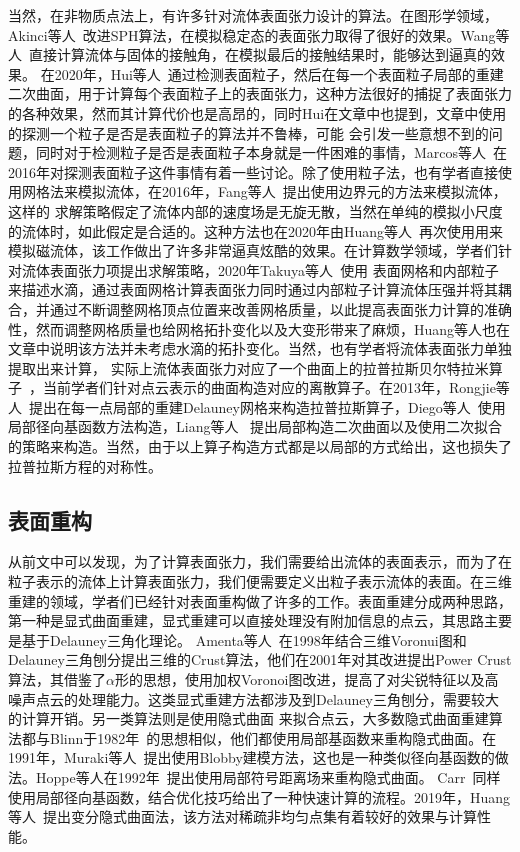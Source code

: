 当然，在非物质点法上，有许多针对流体表面张力设计的算法。在图形学领域，Akinci等人~\cite{akinci2013versatile}改进SPH算法，在模拟稳定态的表面张力取得了很好的效果。Wang等人~\cite{wang2005water}直接计算流体与固体的接触角，在模拟最后的接触结果时，能够达到逼真的效果。
在2020年，Hui等人~\cite{wang2020codimensional}通过检测表面粒子，然后在每一个表面粒子局部的重建二次曲面，用于计算每个表面粒子上的表面张力，这种方法很好的捕捉了表面张力的各种效果，然而其计算代价也是高昂的，同时Hui在文章中也提到，文章中使用的探测一个粒子是否是表面粒子的算法并不鲁棒，可能
会引发一些意想不到的问题，同时对于检测粒子是否是表面粒子本身就是一件困难的事情，Marcos等人~\cite{sandim2016boundary}在2016年对探测表面粒子这件事情有着一些讨论。除了使用粒子法，也有学者直接使用网格法来模拟流体，在2016年，Fang等人~\cite{da2016surface}提出使用边界元的方法来模拟流体，这样的
求解策略假定了流体内部的速度场是无旋无散，当然在单纯的模拟小尺度的流体时，如此假定是合适的。这种方法也在2020年由Huang等人~\cite{huang2020surface}再次使用用来模拟磁流体，该工作做出了许多非常逼真炫酷的效果。在计算数学领域，学者们针对流体表面张力项提出求解策略，2020年Takuya等人~\cite{matsunaga2020moving}使用
表面网格和内部粒子来描述水滴，通过表面网格计算表面张力同时通过内部粒子计算流体压强并将其耦合，并通过不断调整网格顶点位置来改善网格质量，以此提高表面张力计算的准确性，然而调整网格质量也给网格拓扑变化以及大变形带来了麻烦，Huang等人也在文章中说明该方法并未考虑水滴的拓扑变化。当然，也有学者将流体表面张力单独提取出来计算，
实际上流体表面张力对应了一个曲面上的拉普拉斯贝尔特拉米算子~\cite{needham2021visual}，当前学者们针对点云表示的曲面构造对应的离散算子。在2013年，Rongjie等人~\cite{lai2013local}提出在每一点局部的重建Delauney网格来构造拉普拉斯算子，Diego等人~\cite{alvarez2021local}使用局部径向基函数方法构造，Liang等人~\cite{liang2013solving}
提出局部构造二次曲面以及使用二次拟合的策略来构造。当然，由于以上算子构造方式都是以局部的方式给出，这也损失了拉普拉斯方程的对称性。
\subsection{表面重构} 
从前文中可以发现，为了计算表面张力，我们需要给出流体的表面表示，而为了在粒子表示的流体上计算表面张力，我们便需要定义出粒子表示流体的表面。在三维重建的领域，学者们已经针对表面重构做了许多的工作。表面重建分成两种思路，第一种是显式曲面重建，显式重建可以直接处理没有附加信息的点云，其思路主要是基于Delauney三角化理论。
Amenta等人~\cite{amenta1998new}在1998年结合三维Voronui图和Delauney三角刨分提出三维的Crust算法，他们在2001年对其改进提出Power Crust算法，其借鉴了$\alpha$形的思想，使用加权Voronoi图改进，提高了对尖锐特征以及高噪声点云的处理能力。这类显式重建方法都涉及到Delauney三角刨分，需要较大的计算开销。另一类算法则是使用隐式曲面
来拟合点云，大多数隐式曲面重建算法都与Blinn于1982年~\cite{blinn1982generalization}的思想相似，他们都使用局部基函数来重构隐式曲面。在1991年，Muraki等人~\cite{muraki1991volumetric}提出使用Blobby建模方法，这也是一种类似径向基函数的做法。Hoppe等人在1992年~\cite{hoppe1992surface}提出使用局部符号距离场来重构隐式曲面。
Carr~\cite{carr2001reconstruction}同样使用局部径向基函数，结合优化技巧给出了一种快速计算的流程。2019年，Huang等人~\cite{huang2019variational}提出变分隐式曲面法，该方法对稀疏非均匀点集有着较好的效果与计算性能。

